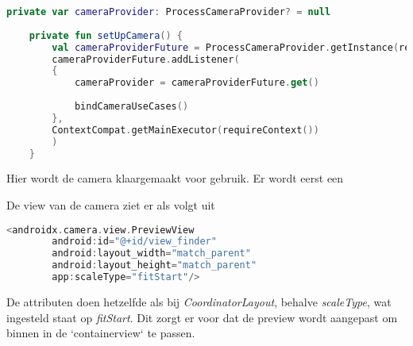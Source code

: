 \begin{lstlisting}[language=Kotlin, caption=setUpCamera in CameraFragment.kt]
    private var cameraProvider: ProcessCameraProvider? = null
    
    private fun setUpCamera() {
        val cameraProviderFuture = ProcessCameraProvider.getInstance(requireContext())
        cameraProviderFuture.addListener(
        {
            cameraProvider = cameraProviderFuture.get()
            
            bindCameraUseCases()
        },
        ContextCompat.getMainExecutor(requireContext())
        )
    }
\end{lstlisting}
Hier wordt de camera klaargemaakt voor gebruik. Er wordt eerst een 


De view van de camera ziet er als volgt uit
\begin{lstlisting}[language=Kotlin, caption=CameraView]
    <androidx.camera.view.PreviewView
        android:id="@+id/view_finder"
        android:layout_width="match_parent"
        android:layout_height="match_parent"
        app:scaleType="fitStart"/>
\end{lstlisting}
De attributen doen hetzelfde als bij \emph{CoordinatorLayout}, behalve \emph{scaleType}, wat ingesteld staat op \emph{fitStart}. Dit zorgt er voor dat de preview wordt aangepast om binnen in de `containerview` te passen.




